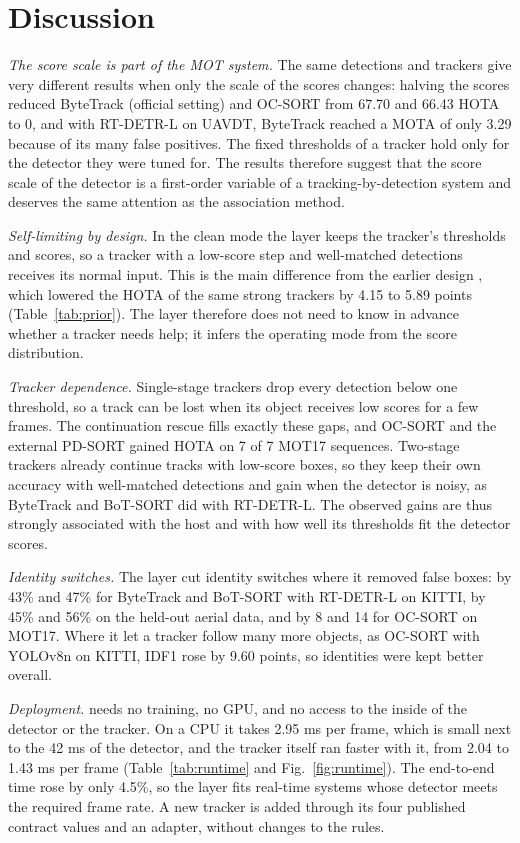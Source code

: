 \section{Discussion}\label{sec:discussion}

\emph{The score scale is part of the MOT system.} The same detections and trackers give very
different results when only the scale of the scores changes: halving the scores reduced ByteTrack
(official setting) and OC-SORT from 67.70 and 66.43 HOTA to 0, and with RT-DETR-L on UAVDT, ByteTrack
reached a MOTA of only 3.29 because of its many false positives. The fixed thresholds of a tracker
hold only for the detector they were tuned for. The results therefore suggest that the score scale
of the detector is a first-order variable of a tracking-by-detection system and deserves the same
attention as the association method.

\emph{Self-limiting by design.} In the clean mode the layer keeps the tracker's thresholds and
scores, so a tracker with a low-score step and well-matched detections receives its normal input.
This is the main difference from the earlier design \aob{}, which lowered the HOTA of the same
strong trackers by 4.15 to 5.89 points (Table~\ref{tab:prior}). The layer therefore does not need
to know in advance whether a tracker needs help; it infers the operating mode from the score
distribution.

\emph{Tracker dependence.} Single-stage trackers drop every detection below one threshold, so a
track can be lost when its object receives low scores for a few frames. The continuation rescue
fills exactly these gaps, and OC-SORT and the external PD-SORT gained HOTA on 7 of 7 MOT17 sequences.
Two-stage trackers already continue tracks with low-score boxes, so they keep their own accuracy
with well-matched detections and gain when the detector is noisy, as ByteTrack and BoT-SORT did with
RT-DETR-L. The observed gains are thus strongly associated with the host and with how well its
thresholds fit the detector scores.

\emph{Identity switches.} The layer cut identity switches where it removed false boxes: by 43\% and
47\% for ByteTrack and BoT-SORT with RT-DETR-L on KITTI, by 45\% and 56\% on the held-out aerial
data, and by 8 and 14 for OC-SORT on MOT17. Where it let a tracker follow many more objects, as
OC-SORT with YOLOv8n on KITTI, IDF1 rose by 9.60 points, so identities were kept better overall.

\emph{Deployment.} \scl{} needs no training, no GPU, and no access to the inside of the detector or
the tracker. On a CPU it takes 2.95 ms per frame, which is small next to the 42 ms of the
detector, and the tracker itself ran faster with it, from 2.04 to 1.43 ms per frame
(Table~\ref{tab:runtime} and Fig.~\ref{fig:runtime}). The end-to-end time rose by only 4.5\%, so
the layer fits real-time systems whose detector meets the required frame rate. A new tracker is
added through its four published contract values and an adapter, without changes to the rules.
